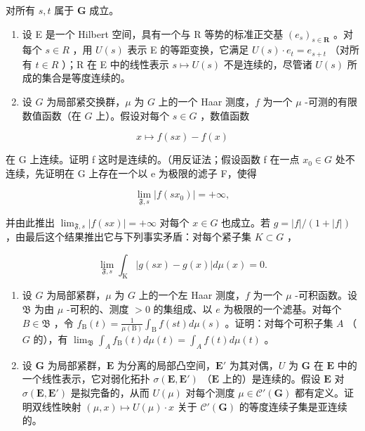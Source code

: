 对所有 \(s, t\) 属于 \(\mathbf{G}\) 成立。

\begin{enumerate}
\def\labelenumi{\arabic{enumi})}
\setcounter{enumi}{6}
\item
  设 E 是一个 Hilbert 空间，具有一个与 R 等势的标准正交基 \((e_{s})_{s\in\mathbf{R}}\) 。对每个 \(s\in R\) ，用 \(U(s)\) 表示 E 的等距变换，它满足 \(U(s)\cdot e_{t}=e_{s+t}\) （对所有 \(t\in R\) ）；R 在 E 中的线性表示 \(s\mapsto U(s)\) 不是连续的，尽管诸 \(U(s)\) 所成的集合是等度连续的。
\item
  设 \(G\) 为局部紧交换群，\(\mu\) 为 \(G\) 上的一个 Haar 测度，\(f\) 为一个 \(\mu\) -可测的有限数值函数（在 \(G\) 上）。假设对每个 \(s \in G\) ，数值函数
\end{enumerate}

\[
x \mapsto f (s x) - f (x)
\]

在 G 上连续。证明 f 这时是连续的。（用反证法；假设函数 f 在一点 \(x_{0} \in G\) 处不连续，先证明在 G 上存在一个以 e 为极限的滤子 F，使得

\[
\lim _ {\mathfrak {F}, s} | f (s x _ {0}) | = + \infty ,
\]

并由此推出 \(\lim_{\mathfrak{F},s}|f(sx)| = +\infty\) 对每个 \(x \in G\) 也成立。若 \(g = |f| / (1 + |f|)\) ，由最后这个结果推出它与下列事实矛盾：对每个紧子集 \(K \subset G\) ，

\[
\lim _ {\mathfrak {F}, s} \int_ {\mathrm{K}} | g (s x) - g (x) | d \mu (x) = 0.
\]

\begin{enumerate}
\def\labelenumi{\arabic{enumi})}
\setcounter{enumi}{8}
\item
  设 \(G\) 为局部紧群，\(\mu\) 为 \(G\) 上的一个左 Haar 测度，\(f\) 为一个 \(\mu\) -可积函数。设 \(\mathfrak{B}\) 为由 \(\mu\) -可积的、测度 \(> 0\) 的集组成、以 \(e\) 为极限的一个滤基。对每个 \(B \in \mathfrak{B}\) ，令 \(f_{\mathrm{B}}(t) = \frac{1}{\mu(\mathrm{B})} \int_{\mathrm{B}} f(st) d\mu(s)\) 。证明：对每个可积子集 \(A\) （\(G\) 的），有 \(\lim_{\mathfrak{B}} \int_{A} f_{\mathrm{B}}(t) d\mu(t) = \int_{A} f(t) d\mu(t)\) 。
\item
  设 \(\mathbf{G}\) 为局部紧群，\(\mathbf{E}\) 为分离的局部凸空间，\(\mathbf{E}'\) 为其对偶，\(U\) 为 \(\mathbf{G}\) 在 \(\mathbf{E}\) 中的一个线性表示，它对弱化拓扑 \(\sigma(\mathbf{E},\mathbf{E}')\) （\(\mathbf{E}\) 上的）是连续的。假设 \(\mathbf{E}\) 对 \(\sigma(\mathbf{E},\mathbf{E}')\) 是拟完备的，从而 \(U(\mu)\) 对每个测度 \(\mu \in \mathcal{C}'(\mathbf{G})\) 都有定义。证明双线性映射 \((\mu,x) \mapsto U(\mu) \cdot x\) 关于 \(\mathcal{C}'(\mathbf{G})\) 的等度连续子集是亚连续的。
\end{enumerate}

